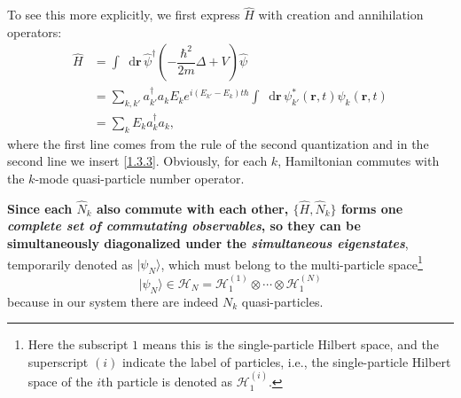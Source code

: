 \documentclass[b5paper,10pt,UTF8]{book}
\newcommand*\dd{\mathop{}\!\mathrm{d}}
\numberwithin{equation}{section}
\begin{document}
		\begin{Proof}
			To see this more explicitly, we first express $\hat{H}$ with creation and annihilation operators:
			\begin{align}
				\hat{H}&=\int\dd\bm{r}\,\hat{\psi}^\dagger\left(-\dfrac{\hbar^2}{2m}\Delta+V\right)\hat{\psi}\nonumber\\
				&=\sum_{k,k'}a_{k'}^\dagger a_k E_k e^{i(E_{k'}-E_k)t\hbar}\int\dd\bm{r}\,\psi_{k'}^*(\bm{r},t)\psi_k(\bm{r},t)\nonumber\\
				&=\sum_k E_ka_k^\dagger a_k,\label{1.3.7}
			\end{align}
			where the first line comes from the rule of the second quantization and in the second line we insert \eqref{1.3.3}.
			Obviously, for each $k$, Hamiltonian commutes with the $k$-mode quasi-particle number operator.
		\end{Proof}
		\textbf{Since each $\hat{N}_k$ also commute with each other, $\{\hat{H},\hat{N}_{k}\}$ forms one \emph{complete set of commutating observables}, so they can be simultaneously diagonalized under the \emph{simultaneous eigenstates}}, temporarily denoted as $|\psi_N\rangle$, which must belong to the multi-particle space\footnote{Here the subscript $1$ means this is the single-particle Hilbert space, and the superscript $(i)$ indicate the label of particles, i.e., the single-particle Hilbert space of the $i$th particle is denoted as $\mathcal{H}_1^{(i)}$.}
		$$|\psi_N\rangle\in\mathcal{H}_N=\mathcal{H}_1^{(1)}\otimes\cdots\otimes\mathcal{H}_1^{(N)}$$
		because in our system there are indeed $N_k$ quasi-particles.
\end{document}
